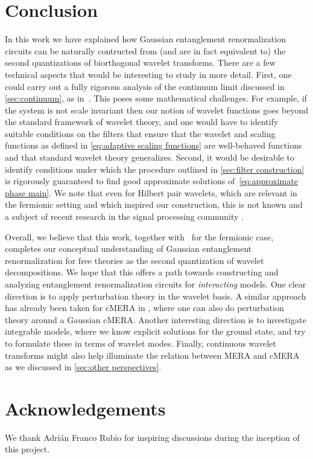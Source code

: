 \documentclass[submission, Phys]{SciPost}
\theoremstyle{definition}
\theoremstyle{remark}
\newcommand{\change}[1]{#1}
\begin{document}
\section{Conclusion}
In this work we have explained how Gaussian entanglement renormalization circuits can be naturally contructed from (and are in fact equivalent to) the second quantizations of biorthogonal wavelet transforms.
\change{There are a few technical aspects that would be interesting to study in more detail.
First, one could carry out a fully rigorous analysis of the continuum limit discussed in \cref{sec:continuum}, as in~\cite{witteveen2019quantum}.
This poses some mathematical challenges.
For example, if the system is not scale invariant then our notion of wavelet functions goes beyond the standard framework of wavelet theory, and one would have to identify suitable conditions on the filters that ensure that the wavelet and scaling functions as defined in \cref{eq:adaptive scaling functions} are well-behaved functions and that standard wavelet theory generalizes.}
\change{Second, it would be desirable to identify conditions under which the procedure outlined in \cref{sec:filter construction} is rigorously guaranteed to find good approximate solutions of~\cref{eq:approximate phase main}.
We note that even for Hilbert pair wavelets, which are relevant in the fermionic setting and which inspired our construction, this is not known and a subject of recent research in the signal processing community \cite{selesnick2002design, achard2017new}.}

Overall, we believe that this work, together with~\cite{evenbly2016entanglement,haegeman2018rigorous} for the fermionic case, completes our conceptual understanding of Gaussian entanglement renormalization for free theories as the second quantization of wavelet decompositions.
We hope that this offers a path towards constructing and analyzing entanglement renormalization circuits for \emph{interacting} models.
One clear direction is to apply perturbation theory in the wavelet basis.
A similar approach has already been taken for cMERA in \cite{cotler2019entanglement}, where one can also do perturbation theory around a Gaussian cMERA.
Another interesting direction is to investigate integrable models, where we know explicit solutions for the ground state, and try to formulate these in terms of wavelet modes.
Finally, continuous wavelet transforms might also help illuminate the relation between MERA and cMERA as we discussed in \cref{sec:other perspectives}.

\section*{Acknowledgements}
We thank Adri\'an Franco Rubio for inspiring discussions during the inception of this project.
\end{document}
